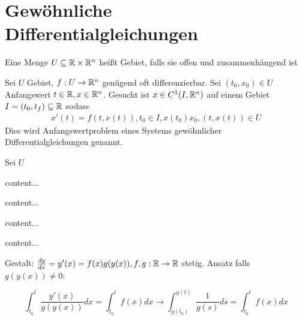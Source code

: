 \begin{satz}
	
\end{satz}

\pagebreak

\section{Gewöhnliche Differentialgleichungen}

\begin{definition}[Gebiet]
	Eine Menge $U \subseteq \mathbb{R} \times \mathbb{R}^n$ heißt Gebiet, falls sie offen und zusammenhängend ist
\end{definition}

\begin{definition}
	Sei $U$ Gebiet, $f : U \rightarrow \mathbb{R}^n$ genügend oft differenzierbar. Sei $(t_0, x_0) \in U$ Anfangswert $t \in \mathbb{R}, x \in \mathbb{R}^n$. Gesucht ist $x \in C^{1}(I,\mathbb{R}^n)$ auf einem Gebiet $I = (t_0, t_f) \subseteq \mathbb{R}$ sodass 
	\begin{align*}
		x'(t) = f(t, x(t)) , t_0 \in I, x(t_0) x_0, (t,x(t)) \in U
	\end{align*}
	Dies wird Anfangswertproblem eines Systems gewöhnlicher Differentialgleichungen genannt.
\end{definition}

\begin{satz}
	Sei $U$
\end{satz}

\begin{definition}
	content...
\end{definition}

\begin{satz}
	content...
\end{satz}

\begin{satz}
	content...
\end{satz}

\begin{definition}
	content...
\end{definition}

\begin{satz}
	
	Gestalt: $\frac{d y}{d x} = y'(x) = f(x)g(y(x)), f,g : \mathbb{R} \rightarrow \mathbb{R}$ stetig. Ansatz falls $g(y(x)) \neq 0$:
	
	\begin{equation*}
		\int_{t_0}^{t} \frac{y'(x)}{g(y(x))} dx = \int_{t_0}^{t} f(x) dx \rightarrow \int_{y(t_0)}^{y(t)} \frac{1}{g(s)} ds = \int_{t_0}^{t} f(x) dx
	\end{equation*}
\end{satz}


